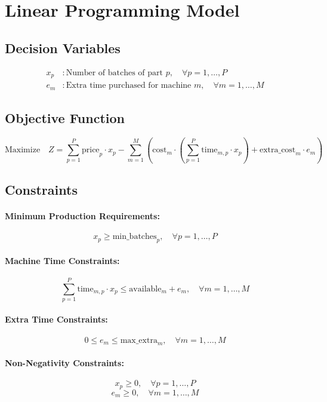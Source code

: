 \documentclass{article}
\begin{document}
\section*{Linear Programming Model}

\subsection*{Decision Variables}
\begin{align*}
x_p &: \text{Number of batches of part } p, \quad \forall p = 1, \ldots, P \\
e_m &: \text{Extra time purchased for machine } m, \quad \forall m = 1, \ldots, M
\end{align*}

\subsection*{Objective Function}
\[
\text{Maximize} \quad Z = \sum_{p=1}^{P} \text{price}_{p} \cdot x_p - \sum_{m=1}^{M} \left( \text{cost}_{m} \cdot \left( \sum_{p=1}^{P} \text{time}_{m,p} \cdot x_p \right) + \text{extra\_cost}_{m} \cdot e_m \right)
\]

\subsection*{Constraints}
\paragraph{Minimum Production Requirements:}
\[
x_p \geq \text{min\_batches}_{p}, \quad \forall p = 1, \ldots, P
\]

\paragraph{Machine Time Constraints:}
\[
\sum_{p=1}^{P} \text{time}_{m,p} \cdot x_p \leq \text{available}_{m} + e_m, \quad \forall m = 1, \ldots, M
\]

\paragraph{Extra Time Constraints:}
\[
0 \leq e_m \leq \text{max\_extra}_{m}, \quad \forall m = 1, \ldots, M
\]

\paragraph{Non-Negativity Constraints:}
\[
x_p \geq 0, \quad \forall p = 1, \ldots, P
\]
\[
e_m \geq 0, \quad \forall m = 1, \ldots, M
\]
\end{document}
